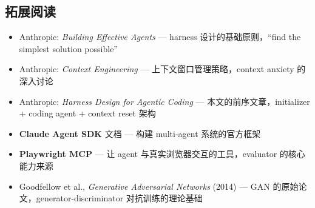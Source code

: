 \documentclass[a4paper]{article}
\begin{document}
\subsection{拓展阅读}

\begin{itemize}[leftmargin=1.5em]
    \item Anthropic: \textit{Building Effective Agents} --- harness 设计的基础原则，``find the simplest solution possible''
    \item Anthropic: \textit{Context Engineering} --- 上下文窗口管理策略，context anxiety 的深入讨论
    \item Anthropic: \textit{Harness Design for Agentic Coding} --- 本文的前序文章，initializer + coding agent + context reset 架构
    \item \textbf{Claude Agent SDK} 文档 --- 构建 multi-agent 系统的官方框架
    \item \textbf{Playwright MCP} --- 让 agent 与真实浏览器交互的工具，evaluator 的核心能力来源
    \item Goodfellow et al., \textit{Generative Adversarial Networks} (2014) --- GAN 的原始论文，generator-discriminator 对抗训练的理论基础
\end{itemize}

\end{document}
